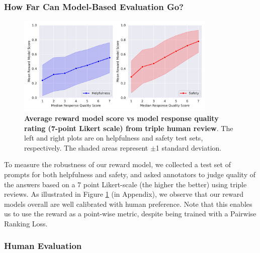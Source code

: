 \subsubsection{How Far Can Model-Based Evaluation Go?}
\label{sec:appendix_detail_results_model_based}

\begin{figure}[!htbp]
\centering
\includegraphics[width=0.85\textwidth]{img/rm/rm_human_eval_corr.pdf}
\caption{\textbf{Average reward model score vs model response quality rating (7-point Likert scale) from triple human review}. The left and right plots are on helpfulness and safety test sets, respectively. The shaded areas represent $\pm$1 standard deviation.}
\label{fig:rm_score_human_rating}
\end{figure}


To measure the robustness of our reward model, we collected a test set of prompts for both helpfulness and safety, and asked annotators to judge quality of the answers based on a 7 point Likert-scale (the higher the better) using triple reviews. 
As illustrated in Figure \ref{fig:rm_score_human_rating} (in Appendix), we observe that our reward models overall are well calibrated with human preference.  Note that this enables us to use the reward as a point-wise metric, despite being trained with a Pairwise Ranking Loss.


\subsubsection{Human Evaluation}
\label{sec:appendix_detail_results}
